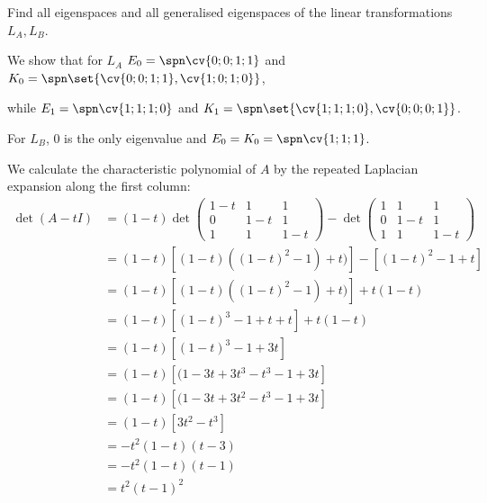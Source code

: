 \documentclass[11pt]{scrartcl}
\begin{document}
\begin{problem*}
  \hfill
  
  Find all eigenspaces and all generalised eigenspaces of the linear
  transformations $L_A, L_B$.
\end{problem*}
\begin{soln}
  \hfill

  We show that for $L_A$ $E_0=\spn\cv{0;0;1;1}$ and  $K_0= \spn\set{\cv{0;0;1;1}, \cv{1;0;1;0}}$, 

  while $E_1=\spn\cv{1;1;1;0}$ and $K_1=\spn\set{\cv{1;1;1;0}, \cv{0;0;0;1}}$.

  For $L_B$, 0 is the only eigenvalue and $E_0=K_0=\spn\cv{1;1;1}$.

  We calculate the characteristic polynomial of $A$ by the repeated
  Laplacian expansion along the first column:
  \begin{align}
    \det(A-t I) &= (1-t)\det 
                  \begin{pmatrix}
                    1-t & 1 & 1\\
                    0   & 1-t & 1 \\
                    1 & 1 & 1-t
                  \end{pmatrix} - \det
                            \begin{pmatrix}
                              1 & 1 & 1 \\
                              0 & 1-t & 1\\
                              1 & 1 & 1-t
                            \end{pmatrix}\\
                &= (1-t)[(1-t)((1-t)^2-1)+t)] - [(1-t)^2-1+t]\\
                &= (1-t)[(1-t)((1-t)^2-1)+t)] + t(1-t)\\
                &= (1-t)[(1-t)^3-1+t+t] +t(1-t)\\
                &= (1-t)[(1-t)^3-1+3t]\\
                &= (1-t)[(1-3t+3t^3-t^3-1+3t]\\
                &= (1-t)[(1-3t+3t^2-t^3-1+3t]\\
                &= (1-t)[3t^2-t^3]\\
                &= -t^2(1-t)(t-3)\\
                &= -t^2(1-t)(t-1)\\
                &= t^2(t-1)^2\\
  \end{align}


\end{soln}
\end{document}
